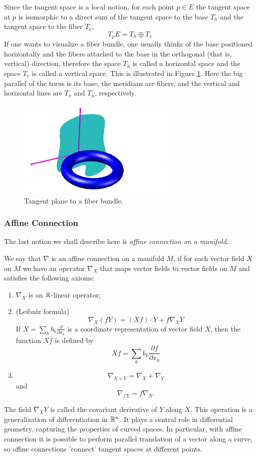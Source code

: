 Since the tangent space is a local notion, for each point $p \in E$
the tangent space at $p$ is isomorphic to a direct sum 
of the tangent space to the base $T_h$ and the tangent space to the fiber $T_v$,
\begin{equation}
    T_p E = T_h \oplus T_v
\end{equation}
If one wants to visualize a fiber bundle,
one usually thinks of the base positioned horizontally and the fibers
attached to the base in the orthogonal (that is, vertical) direction,
therefore the space $T_h$ is called a horizontal space and the space $T_v$
is called a vertical space. This is illustrated in Figure \ref{fig:torus_tangent}. Here 
the big parallel of the torus is its base, the meridians are fibers, and the vertical and
horizontal lines are $T_v$ and $T_h$, respectively.

\begin{figure}
        \centering
                \includegraphics[width=8cm]{images/torus_tangent.jpg}
        \caption{Tangent plane to a fiber bundle.}
        \label{fig:torus_tangent}
\end{figure}

\subsubsection{Affine Connection}

The last notion we shall describe here is \textit{affine connection on a manifold}.

We say that $\nabla$ is an affine connection on a manifold $M$,
if for each vector field $X$ on $M$ we have an operator $\nabla_X$ that
maps vector fields to vector fields on $M$ and satisfies 
the following axioms:
\begin{enumerate}
    \item $\nabla_X$ is an $\mathbb{R}$-linear operator;
    \item (Leibniz formula) $$\nabla_X(fY) = (Xf) \cdot Y + f \nabla_X Y $$
        If $X = \sum_k b_k \frac{\partial}{\partial x_k}$ is a coordinate representation 
        of vector field $X$, then the function
        $Xf$ is defined by
        $$Xf = \sum_k b_k \frac{\partial f}{\partial x_k}$$
    \item $$ \nabla_{X + Y} = \nabla_X + \nabla_Y $$
        and
        $$ \nabla_{fX} = f \nabla_X.$$
\end{enumerate}
The field $\nabla_{X} Y$ is called the covariant derivative of $Y$ along $X$.
This operation is a generalization of differentiation in $\mathbb{R}^n$.
It plays a central role in differential geometry,
capturing the properties of curved spaces. In particular,
with affine connection it is possible to perform
parallel translation of a vector along a curve, so
affine connections 'connect' tangent
spaces at different points.


